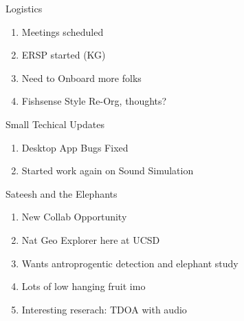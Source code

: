 \begin{frame}{Logistics}
    \begin{enumerate}
        \item Meetings scheduled
        \item ERSP started (KG)
        \item Need to Onboard more folks
        \item Fishsense Style Re-Org, thoughts?
    \end{enumerate}
\end{frame}
\begin{frame}{Small Techical Updates}
    \begin{enumerate}
        \item Desktop App Bugs Fixed
        \item Started work again on Sound Simulation
    \end{enumerate}
\end{frame}
\begin{frame}{Sateesh and the Elephants}
    \begin{enumerate}
        \item New Collab Opportunity
        \item Nat Geo Explorer here at UCSD
        \item Wants antroprogentic detection and elephant study
        \item Lots of low hanging fruit imo
        \item Interesting reserach: TDOA with audio
    \end{enumerate}
\end{frame}